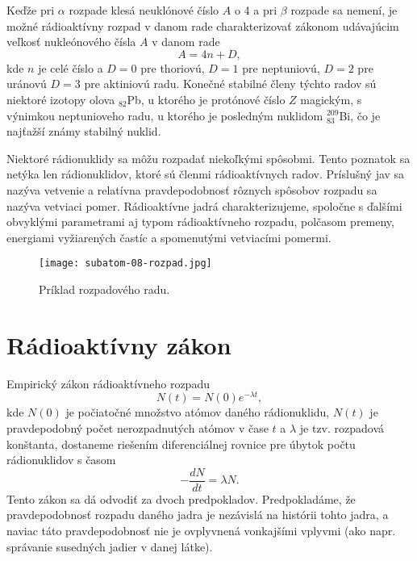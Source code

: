 \documentclass[../../main.tex]{subfiles}
\begin{document}
Keďže pri $\alpha$ rozpade klesá neuklónové číslo $A$ o 4 a pri $\beta$ rozpade sa nemení, je možné rádioaktívny rozpad v danom rade charakterizovať zákonom udávajúcim veľkosť nukleónového čísla $A$ v danom rade
$$ A = 4n + D,$$
kde $n$ je celé číslo a $D=0$ pre thoriovú, $D=1$ pre neptuniovú, $D=2$ pre uránovú $D=3$ pre aktiniovú radu. Konečné stabilné členy týchto radov sú niektoré izotopy olova $_{82}$Pb, u ktorého je protónové číslo $Z$ magickým, s výnimkou neptunioveho radu, u ktorého je posledným nuklidom $_{83}^{209}$Bi, čo je najťažší známy stabilný nuklid. 

Niektoré rádionuklidy sa môžu rozpadať niekoľkými spôsobmi. Tento poznatok sa netýka len rádionuklidov, ktoré sú členmi rádioaktívnych radov. Príslušný jav sa nazýva vetvenie a relatívna pravdepodobnosť rôznych spôsobov rozpadu sa nazýva vetviaci pomer. Rádioaktívne jadrá charakterizujeme, spoločne s ďalšími obvyklými parametrami aj typom rádioaktívneho rozpadu, polčasom premeny, energiami vyžiarených častíc a spomenutými vetviacími pomermi.

\begin{figure}[!h]
\texttt{[image: subatom-08-rozpad.jpg]}
\centering
\caption{Príklad rozpadového radu.}
\label{sf8:fig:rozpad}
\end{figure}

\section{Rádioaktívny zákon}
Empirický zákon rádioaktívneho rozpadu
\begin{equation}
N(t) = N(0)e^{-\lambda t},
\end{equation}
kde $N(0)$ je počiatočné množstvo atómov daného rádionuklidu, $N(t)$ je pravdepodobný počet nerozpadnutých atómov v čase $t$ a $\lambda$ je tzv. rozpadová konštanta, dostaneme riešením diferenciálnej rovnice pre úbytok počtu rádionuklidov s časom
\begin{equation}
-\frac{dN}{dt} = \lambda N . 
\end{equation}
Tento zákon sa dá odvodiť za dvoch predpokladov. Predpokladáme, že pravdepodobnosť rozpadu daného jadra je nezávislá na histórii tohto jadra, a naviac táto pravdepodobnosť nie je ovplyvnená vonkajšími vplyvmi (ako napr. správanie susedných jadier v danej látke).
\end{document}
